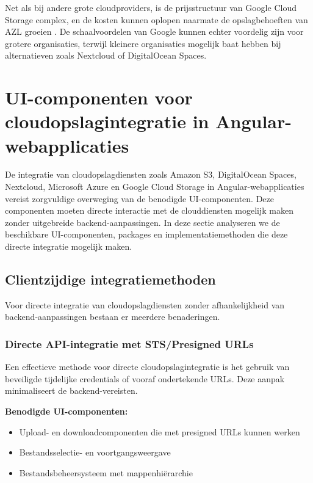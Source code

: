 Net als bij andere grote cloudproviders, is de prijsstructuur van Google Cloud Storage complex, en de kosten kunnen oplopen naarmate de opslagbehoeften van AZL groeien \autocite{google_pricing}. De schaalvoordelen van Google kunnen echter voordelig zijn voor grotere organisaties, terwijl kleinere organisaties mogelijk baat hebben bij alternatieven zoals Nextcloud of DigitalOcean Spaces.


\section{UI-componenten voor cloudopslagintegratie in Angular-webapplicaties}

De integratie van cloudopslagdiensten zoals Amazon S3, DigitalOcean Spaces, Nextcloud, Microsoft Azure en Google Cloud Storage in Angular-webapplicaties vereist zorgvuldige overweging van de benodigde UI-componenten. Deze componenten moeten directe interactie met de clouddiensten mogelijk maken zonder uitgebreide backend-aanpassingen. In deze sectie analyseren we de beschikbare UI-componenten, packages en implementatiemethoden die deze directe integratie mogelijk maken.

\subsection{Clientzijdige integratiemethoden}

Voor directe integratie van cloudopslagdiensten zonder afhankelijkheid van backend-aanpassingen bestaan er meerdere benaderingen.

\subsubsection{Directe API-integratie met STS/Presigned URLs}

Een effectieve methode voor directe cloudopslagintegratie is het gebruik van beveiligde tijdelijke credentials of vooraf ondertekende URLs. Deze aanpak minimaliseert de backend-vereisten.

\textbf{Benodigde UI-componenten:}
\begin{itemize}
    \item Upload- en downloadcomponenten die met presigned URLs kunnen werken
    \item Bestandsselectie- en voortgangsweergave
    \item Bestandsbeheersysteem met mappenhiërarchie
\end{itemize}

